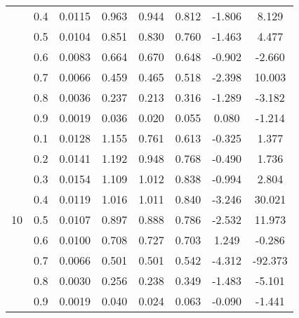 \documentclass[11pt,a4paper]{report}
\begin{document}
\begin{longtable}{ | c | c || c | c | c | c | c | c | }
 & 0.4 & 0.0115 & 0.963 & 0.944 & 0.812 & -1.806 & 8.129 \\
 & 0.5 & 0.0104 & 0.851 & 0.830 & 0.760 & -1.463 & 4.477 \\
 & 0.6 & 0.0083 & 0.664 & 0.670 & 0.648 & -0.902 & -2.660 \\
 & 0.7 & 0.0066 & 0.459 & 0.465 & 0.518 & -2.398 & 10.003 \\
 & 0.8 & 0.0036 & 0.237 & 0.213 & 0.316 & -1.289 & -3.182 \\
 & 0.9 & 0.0019 & 0.036 & 0.020 & 0.055 & 0.080 & -1.214 \\
 \hline
\multirow{9}{*}{10} & 0.1 & 0.0128 & 1.155 & 0.761 & 0.613 & -0.325 & 1.377 \\
 & 0.2 & 0.0141 & 1.192 & 0.948 & 0.768 & -0.490 & 1.736 \\
 & 0.3 & 0.0154 & 1.109 & 1.012 & 0.838 & -0.994 & 2.804 \\
 & 0.4 & 0.0119 & 1.016 & 1.011 & 0.840 & -3.246 & 30.021 \\
 & 0.5 & 0.0107 & 0.897 & 0.888 & 0.786 & -2.532 & 11.973 \\
 & 0.6 & 0.0100 & 0.708 & 0.727 & 0.703 & 1.249 & -0.286 \\
 & 0.7 & 0.0066 & 0.501 & 0.501 & 0.542 & -4.312 & -92.373 \\
 & 0.8 & 0.0030 & 0.256 & 0.238 & 0.349 & -1.483 & -5.101 \\
 & 0.9 & 0.0019 & 0.040 & 0.024 & 0.063 & -0.090 & -1.441 \\
 \hline
\hline
\end{longtable}
\end{document}
